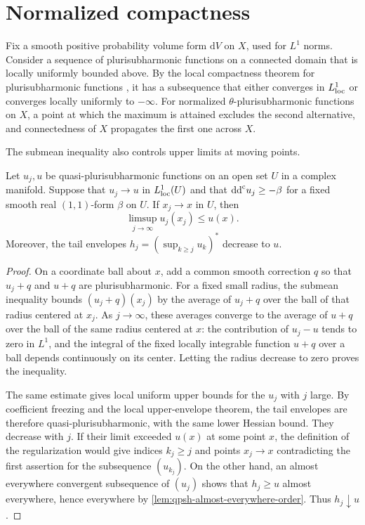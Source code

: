 \section{Normalized compactness}
\label{sec:psh-compactness}

Fix a smooth positive probability volume form $\mathrm{d}V$ on $X$, used for $L^1$ norms. Consider a sequence of plurisubharmonic functions on a connected domain that is locally uniformly bounded above. By the local compactness theorem for plurisubharmonic functions \cite[Theorem~1.46]{GZ17}, it has a subsequence that either converges in $L^1_{\mathrm{loc}}$ or converges locally uniformly to $-\infty$. For normalized $\theta$-plurisubharmonic functions on $X$, a point at which the maximum is attained excludes the second alternative, and connectedness of $X$ propagates the first one across $X$.

The submean inequality also controls upper limits at moving points.

\begin{lemma}\label{lem:qpsh-hartogs}
Let $u_j,u$ be quasi-plurisubharmonic functions on an open set $U$ in a complex manifold. Suppose that $u_j\to u$ in $L^1_{\mathrm{loc}}(U)$ and that $\mathrm{dd}^{\mathrm{c}} u_j\geq-\beta$ for a fixed smooth real $(1,1)$-form $\beta$ on $U$. If $x_j\to x$ in $U$, then
\[
 \limsup_{j\to\infty}u_j(x_j)\leq u(x).
\]
Moreover, the tail envelopes $h_j=(\sup_{k\geq j}u_k)^*$ decrease to $u$.
\end{lemma}
\begin{proof}
On a coordinate ball about $x$, add a common smooth correction $q$ so that $u_j+q$ and $u+q$ are plurisubharmonic. For a fixed small radius, the submean inequality bounds $(u_j+q)(x_j)$ by the average of $u_j+q$ over the ball of that radius centered at $x_j$. As $j\to\infty$, these averages converge to the average of $u+q$ over the ball of the same radius centered at $x$: the contribution of $u_j-u$ tends to zero in $L^1$, and the integral of the fixed locally integrable function $u+q$ over a ball depends continuously on its center. Letting the radius decrease to zero proves the inequality.

The same estimate gives local uniform upper bounds for the $u_j$ with $j$ large. By coefficient freezing and the local upper-envelope theorem, the tail envelopes are therefore quasi-plurisubharmonic, with the same lower Hessian bound. They decrease with $j$. If their limit exceeded $u(x)$ at some point $x$, the definition of the regularization would give indices $k_j\geq j$ and points $x_j\to x$ contradicting the first assertion for the subsequence $(u_{k_j})$. On the other hand, an almost everywhere convergent subsequence of $(u_j)$ shows that $h_j\geq u$ almost everywhere, hence everywhere by \cref{lem:qpsh-almost-everywhere-order}. Thus $h_j\downarrow u$.
\end{proof}

